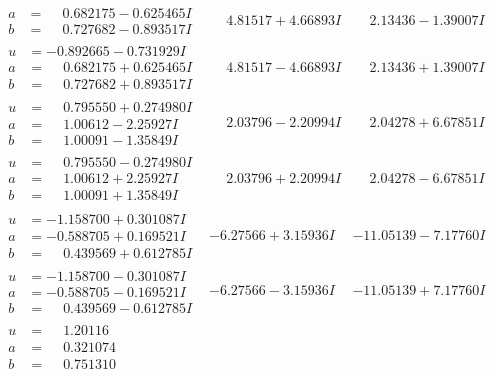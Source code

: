 \documentclass[1p]{elsarticle_modified}
\theoremstyle{definition}
\begin{document}
$$\begin{array}{c|c|c}
\begin{aligned}
a &= \phantom{-}0.682175 - 0.625465 I \\
b &= \phantom{-}0.727682 - 0.893517 I\end{aligned}
 & \phantom{-}4.81517 + 4.66893 I & \phantom{-}2.13436 - 1.39007 I \\ \hline\begin{aligned}
u &= -0.892665 - 0.731929 I \\
a &= \phantom{-}0.682175 + 0.625465 I \\
b &= \phantom{-}0.727682 + 0.893517 I\end{aligned}
 & \phantom{-}4.81517 - 4.66893 I & \phantom{-}2.13436 + 1.39007 I \\ \hline\begin{aligned}
u &= \phantom{-}0.795550 + 0.274980 I \\
a &= \phantom{-}1.00612 - 2.25927 I \\
b &= \phantom{-}1.00091 - 1.35849 I\end{aligned}
 & \phantom{-}2.03796 - 2.20994 I & \phantom{-}2.04278 + 6.67851 I \\ \hline\begin{aligned}
u &= \phantom{-}0.795550 - 0.274980 I \\
a &= \phantom{-}1.00612 + 2.25927 I \\
b &= \phantom{-}1.00091 + 1.35849 I\end{aligned}
 & \phantom{-}2.03796 + 2.20994 I & \phantom{-}2.04278 - 6.67851 I \\ \hline\begin{aligned}
u &= -1.158700 + 0.301087 I \\
a &= -0.588705 + 0.169521 I \\
b &= \phantom{-}0.439569 + 0.612785 I\end{aligned}
 & -6.27566 + 3.15936 I & -11.05139 - 7.17760 I \\ \hline\begin{aligned}
u &= -1.158700 - 0.301087 I \\
a &= -0.588705 - 0.169521 I \\
b &= \phantom{-}0.439569 - 0.612785 I\end{aligned}
 & -6.27566 - 3.15936 I & -11.05139 + 7.17760 I \\ \hline\begin{aligned}
u &= \phantom{-}1.20116\phantom{ +0.000000I} \\
a &= \phantom{-}0.321074\phantom{ +0.000000I} \\
b &= \phantom{-}0.751310\phantom{ +0.000000I}\end{aligned}

\end{array}$$
\end{document}
